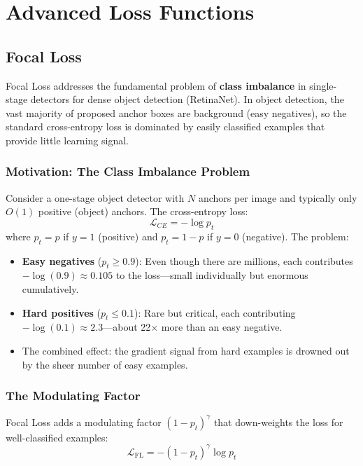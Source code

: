 \section{Advanced Loss Functions}

\subsection{Focal Loss}

Focal Loss \cite{lin2017focal} addresses the fundamental problem of \textbf{class imbalance} in single-stage detectors for dense object detection (RetinaNet). In object detection, the vast majority of proposed anchor boxes are background (easy negatives), so the standard cross-entropy loss is dominated by easily classified examples that provide little learning signal.

\subsubsection{Motivation: The Class Imbalance Problem}

Consider a one-stage object detector with $N$ anchors per image and typically only $O(1)$ positive (object) anchors. The cross-entropy loss:
\begin{equation}
\mathcal{L}_{CE} = -\log p_t
\end{equation}
where $p_t = p$ if $y = 1$ (positive) and $p_t = 1 - p$ if $y = 0$ (negative). The problem:
\begin{itemize}
    \item \textbf{Easy negatives} ($p_t \geq 0.9$): Even though there are millions, each contributes $-\log(0.9) \approx 0.105$ to the loss---small individually but enormous cumulatively.
    \item \textbf{Hard positives} ($p_t \leq 0.1$): Rare but critical, each contributing $-\log(0.1) \approx 2.3$---about 22$\times$ more than an easy negative.
    \item The combined effect: the gradient signal from hard examples is drowned out by the sheer number of easy examples.
\end{itemize}

\subsubsection{The Modulating Factor}

Focal Loss adds a modulating factor $(1 - p_t)^\gamma$ that down-weights the loss for well-classified examples:
\begin{equation}
\mathcal{L}_{\text{FL}} = -(1 - p_t)^\gamma \log p_t
\end{equation}


